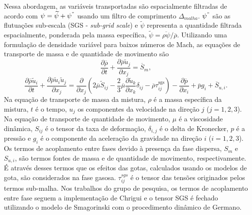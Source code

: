 Nessa abordagem, as variáveis transportadas são espacialmente filtradas de acordo com $\psi = \widetilde\psi + \psi^"$ usando um filtro de comprimento $\Delta_{malha}$. $\psi^"$ são as flutuações sub-escala (SGS - \emph{sub-grid scale}) e $\widetilde\psi$ representa a quantidade filtrada espacialmente, ponderada pela massa específica, $\widetilde\psi = \overline{\rho\psi}/\overline\rho$.
Utilizando uma formulação de densidade variável para baixos números de Mach, as equações de transporte de massa e de quantidade de movimento são
\begin{equation}
    \frac{\partial \overline \rho}{\partial t} + 
    \frac{\partial \overline \rho \widetilde u_j}{\partial x_j} = 
    \overline S_m,
\end{equation}
\begin{equation}
    \frac{\partial \overline\rho \widetilde u_i}{\partial t} + 
    \frac{\partial \overline\rho \widetilde u_i \widetilde u_j}{\partial x_j} =
    \frac{\partial }{\partial x_j} \left(
        2\overline\mu \widetilde S_{ij} -
        \frac{2}{3}\overline\mu \frac{\partial \widetilde u_k}{\partial x_k} \delta_{ij} -
        \overline\rho \tau_{ij}^{\text{sgs}}
    \right) -
    \frac{\partial \overline p}{\partial x_i} +
    \overline p g_i + 
    \overline S_{u,i}.
\end{equation}
Na equação de transporte de massa da mistura, $\rho$ é a massa específica da mistura, $t$ é o tempo, $u_j$ os componentes da velocidade na direção $j$ ($j=1,2,3$).
Na equação de transporte de quantidade de movimento, $\mu$ é a viscosidade dinâmica, $S_{ij}$ é o tensor da taxa de deformação, $\delta_{i,j}$ é o delta de Kronecker, $p$ é a pressão e $g_i$ é o componente da aceleração da gravidade na direção	$i$ ($i=1,2,3$). 
Os termos de acoplamento entre fases devido à presença da fase dispersa, $S_m$ e $S_{u,i}$,  são termos fontes de massa e de quantidade de movimento, respectivamente.
É através desses termos que os efeitos das gotas, calculados usando os modelos de gota, são considerados na fase gasosa.
$\tau_{ij}^{sgs}$ é o tensor das tensões originados pelos termos sub-malha.
Nos trabalhos do grupo de pesquisa, os termos de acoplamento entre fase seguem a implementação de Chrigui\etal{} \cite{ChriguiM2012} e o tensor SGS é fechado utilizando o modelo de Smagorinski \cite{Pope2000} com o procedimento dinâmico de Germano\etal \cite{Germano1991}.

